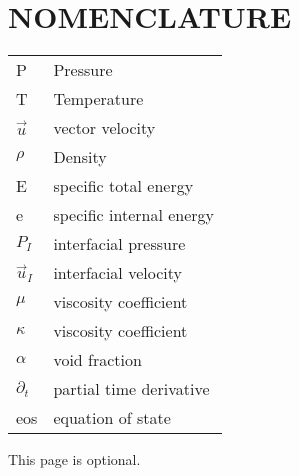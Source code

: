 %
%
%


\chapter*{NOMENCLATURE}

\begin{tabular}{ll}
P & Pressure\tabularnewline
T & Temperature\tabularnewline
$\vec{u}$ & vector velocity \tabularnewline
$\rho$ & Density \tabularnewline
E & specific total energy \tabularnewline
e & specific internal energy \tabularnewline
$P_I$ & interfacial pressure \tabularnewline
$\vec{u}_I$ & interfacial velocity \tabularnewline
$\mu$ & viscosity coefficient \tabularnewline
$\kappa$ & viscosity coefficient \tabularnewline
$\alpha$ & void fraction \tabularnewline
$\partial_t$ & partial time derivative \tabularnewline
eos & equation of state \tabularnewline
\end{tabular}

\vspace{2em}

This page is optional.

\pagebreak{}